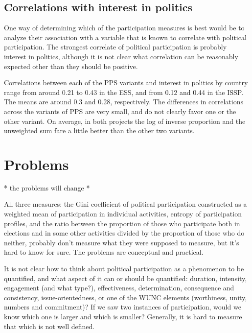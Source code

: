 \documentclass[12pt,]{article}
\begin{document}
\hypertarget{correlations-with-interest-in-politics}{%
\subsection{Correlations with interest in politics}\label{correlations-with-interest-in-politics}}

One way of determining which of the participation measures is best would be to analyze their association with a variable that is known to correlate with political participation. The strongest correlate of political participation is probably interest in politics, although it is not clear what correlation can be reasonably expected other than they should be positive.

Correlations between each of the PPS variants and interest in politics by country range from around 0.21 to 0.43 in the ESS, and from 0.12 and 0.44 in the ISSP. The means are around 0.3 and 0.28, respectively. The differences in correlations across the variants of PPS are very small, and do not clearly favor one or the other variant. On average, in both projects the log of inverse proportion and the unweighted sum fare a little better than the other two variants.

\hypertarget{problems}{%
\section{Problems}\label{problems}}

* the problems will change *

All three measures: the Gini coefficient of political participation constructed as a weighted mean of participation in individual activities, entropy of participation profiles, and the ratio between the proportion of those who participate both in elections and in some other activities divided by the proportion of those who do neither, probably don't measure what they were supposed to measure, but it's hard to know for sure. The problems are conceptual and practical.

It is not clear how to think about political participation as a phenomenon to be quantified, and what aspect of it can or should be quantified: duration, intensity, engagement (and what type?), effectiveness, determination, consequence and consistency, issue-orientedness, or one of the WUNC elements (worthiness, unity, numbers and commitment)? If we saw two instances of participation, would we know which one is larger and which is smaller?
Generally, it is hard to measure that which is not well defined.
\end{document}
